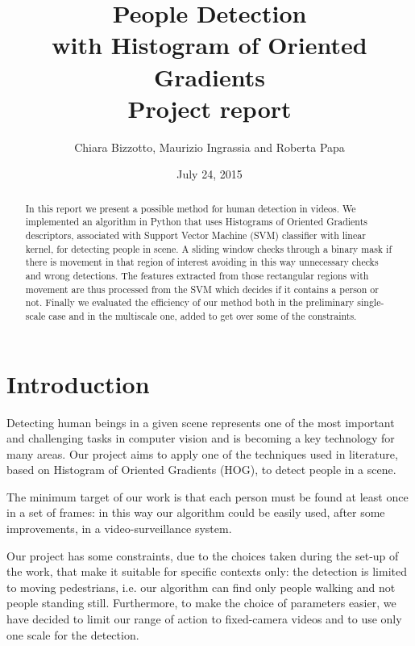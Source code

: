 \documentclass[a4paper,letterpaper, 11pt, onecolumn]{article} %
\begin{document}
\title{People Detection \\with Histogram of Oriented Gradients \\
\large Project report}
\date{July 24,  2015}
\author{Chiara Bizzotto, Maurizio Ingrassia and Roberta Papa}

\maketitle

\begin{abstract}
In this report we present a possible method for human detection in videos. We implemented an algorithm in Python that uses Histograms of Oriented Gradients descriptors, associated with Support Vector Machine (SVM) classifier with linear kernel, for detecting people in scene. A sliding window checks through a binary mask if there is movement in that region of interest avoiding in this way unnecessary checks and wrong detections. The features extracted from those rectangular regions with movement are thus processed from the SVM which decides if it contains a person or not.
Finally we evaluated the efficiency of our method both in the preliminary single-scale case and in the multiscale one, added to get over some of the constraints.
\end{abstract}

\section{Introduction}
Detecting human beings in a given scene represents one of the most important and challenging tasks in computer vision and is becoming a key technology for many areas.
Our project aims to apply one of the techniques used in literature, based on Histogram of Oriented Gradients (HOG), to detect people in a scene. 

The minimum target of our work is that each person must be found at least once in a set of frames: in this way our algorithm could be easily used, after some improvements, in a video-surveillance system.

Our project has some constraints, due to the choices taken during the set-up of the work, that make it suitable for specific contexts only: the detection is limited to moving pedestrians, i.e. our algorithm can find only people walking and not people standing still. Furthermore, to make the choice of parameters easier, we have decided to limit our range of action to fixed-camera videos and to use only one scale for the detection.
\end{document}
